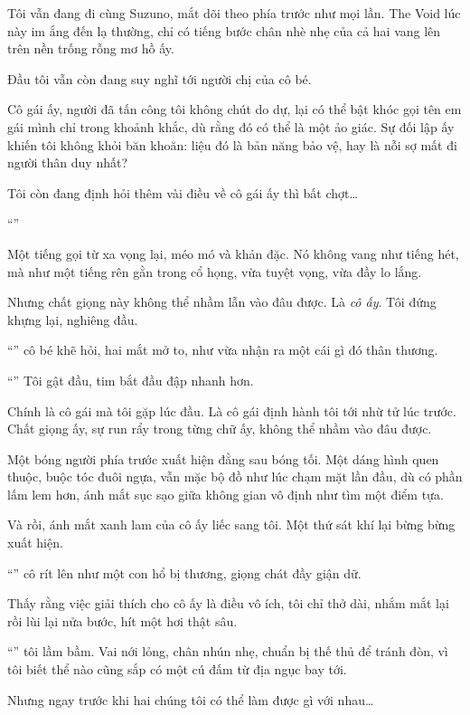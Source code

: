 \documentclass[../main.tex]{subfiles}
\begin{document}
Tôi vẫn đang đi cùng Suzuno, mắt dõi theo phía trước như mọi lần. The Void lúc này im ắng đến lạ thường, chỉ có tiếng bước chân nhè nhẹ của cả hai vang lên trên nền trống rỗng mơ hồ ấy.

Đầu tôi vẫn còn đang suy nghĩ tới người chị của cô bé.

Cô gái ấy, người đã tấn công tôi không chút do dự, lại có thể bật khóc gọi tên em gái mình chỉ trong khoảnh khắc, dù rằng đó có thể là một ảo giác. Sự đối lập ấy khiến tôi không khỏi băn khoăn: liệu đó là bản năng bảo vệ, hay là nỗi sợ mất đi người thân duy nhất?

Tôi còn đang định hỏi thêm vài điều về cô gái ấy thì bất chợt\dots

``''

Một tiếng gọi từ xa vọng lại, méo mó và khản đặc. Nó không vang như tiếng hét, mà như một tiếng rên gằn trong cổ họng, vừa tuyệt vọng, vừa đầy lo lắng.

Nhưng chất giọng này không thể nhầm lẫn vào đâu được. Là \emph{cô ấy}. Tôi đứng khựng lại, nghiêng đầu.

``'' cô bé khẽ hỏi, hai mắt mở to, như vừa nhận ra một cái gì đó thân thương.

``'' Tôi gật đầu, tim bắt đầu đập nhanh hơn.

Chính là cô gái mà tôi gặp lúc đầu. Là cô gái định hành tôi tới nhừ tử lúc trước. Chất giọng ấy, sự run rẩy trong từng chữ ấy, không thể nhầm vào đâu được.

Một bóng người phía trước xuất hiện đằng sau bóng tối. Một dáng hình quen thuộc, buộc tóc đuôi ngựa, vẫn mặc bộ đồ như lúc chạm mặt lần đầu, dù có phần lấm lem hơn, ánh mắt sục sạo giữa không gian vô định như tìm một điểm tựa.

Và rồi, ánh mắt xanh lam của cô ấy liếc sang tôi. Một thứ sát khí lại bừng bừng xuất hiện.

``'' cô rít lên như một con hổ bị thương, giọng chát đầy giận dữ.

Thấy rằng việc giải thích cho cô ấy là điều vô ích, tôi chỉ thở dài, nhắm mắt lại rồi lùi lại nửa bước, hít một hơi thật sâu.

``'' tôi lầm bầm. Vai nới lỏng, chân nhún nhẹ, chuẩn bị thế thủ để tránh đòn, vì tôi biết thể nào cũng sắp có một cú đấm từ địa ngục bay tới.

Nhưng ngay trước khi hai chúng tôi có thể làm được gì với nhau\dots
\end{document}
